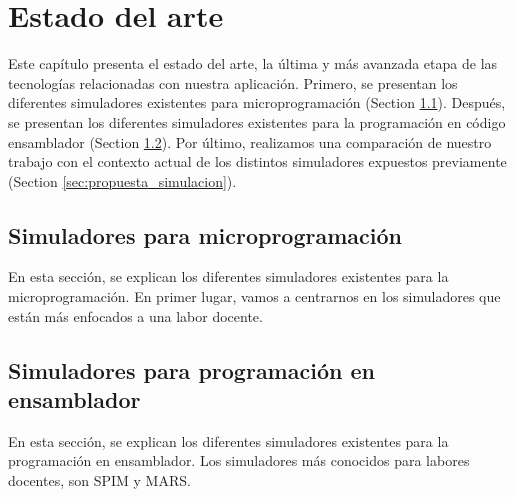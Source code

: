 \chead[]{}
\renewcommand{\headrulewidth}{0.5pt}

\lfoot[]{}
\cfoot[]{}
\rfoot[]{}
\renewcommand{\footrulewidth}{0pt}

\chapter{Estado del arte}
\label{ch:state_of_the_art}

Este capítulo presenta el estado del arte, la última y más avanzada etapa de las tecnologías relacionadas con nuestra aplicación. Primero, se presentan los diferentes simuladores existentes para microprogramación (Section \ref{sec:simuladores_microprogramacion}). Después, se presentan los diferentes simuladores existentes para la programación en código ensamblador (Section \ref{sec:simuladores_ensamblador}). Por último, realizamos una comparación de nuestro trabajo con el contexto actual de los distintos simuladores expuestos previamente (Section \ref{sec:propuesta_simulacion}).

\section{Simuladores para microprogramación}
\label{sec:simuladores_microprogramacion}

En esta sección, se explican los diferentes simuladores existentes para la microprogramación. En primer lugar, vamos a centrarnos en los simuladores que están más enfocados a una labor docente. 

\section{Simuladores para programación en ensamblador}
\label{sec:simuladores_ensamblador}
En esta sección, se explican los diferentes simuladores existentes para la programación en ensamblador. Los simuladores más conocidos para labores docentes, son SPIM y MARS.

